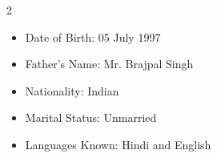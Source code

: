 \documentclass[10pt,a4paper,ragged2e]{maltacv}
\begin{document}

\begin{multicols}{2}


\end{multicols}



\begin{itemize}
\item Date of Birth: 05 July 1997
\item Father's Name: Mr. Brajpal Singh
\item Nationality: Indian
\item Marital Status: Unmarried
\item Languages Known: Hindi and English
\end{itemize}
\end{document}
